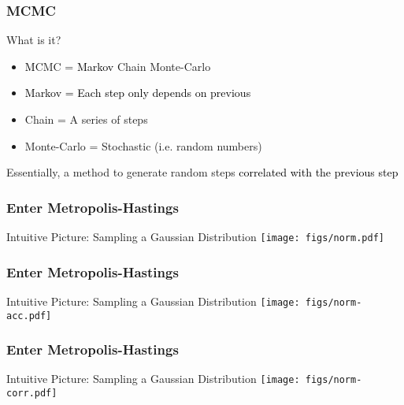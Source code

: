 \documentclass[mathserif]{beamer}
\begin{document}
\begin{frame}
  \frametitle{MCMC}

  \begin{block}{What is it?}
    \begin{itemize}
    \item \textcolor{black}{M}CMC = \textcolor{black}{Markov} Chain Monte-Carlo
    \item \textcolor{black}{Markov = Each step only depends on previous}
    \item Chain = A series of steps
    \item Monte-Carlo = Stochastic (i.e. random numbers)
    \end{itemize}
    Essentially, a method to generate random steps \textcolor{black}{correlated with the previous step}

  \end{block}
\end{frame}

\begin{frame}
\frametitle{Enter Metropolis-Hastings}
\begin{block}{Intuitive Picture: Sampling a Gaussian Distribution}
\centering
  \texttt{[image: figs/norm.pdf]}
\end{block}

\end{frame}

\begin{frame}
\frametitle{Enter Metropolis-Hastings}

\begin{block}{Intuitive Picture: Sampling a Gaussian Distribution}
\centering
  \texttt{[image: figs/norm-acc.pdf]}
\end{block}

\end{frame}

\begin{frame}
\frametitle{Enter Metropolis-Hastings}

\begin{block}{Intuitive Picture: Sampling a Gaussian Distribution}
\centering
  \texttt{[image: figs/norm-corr.pdf]}
\end{block}

\end{frame}
\end{document}
